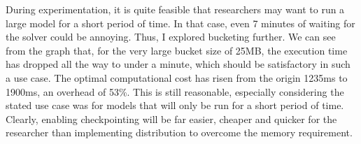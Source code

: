 During experimentation, it is quite feasible that researchers may want to run a large model for a short period of time.
In that case, even 7 minutes of waiting for the solver could be annoying.
Thus, I explored bucketing further.
We can see from the graph that, for the very large bucket size of 25MB, the execution time has dropped all the way to under a minute, which should be satisfactory in such a use case.
The optimal computational cost has risen from the origin 1235ms to 1900ms, an overhead of 53\%.
This is still reasonable, especially considering the stated use case was for models that will only be run for a short period of time.
Clearly, enabling checkpointing will be far easier, cheaper and quicker for the researcher than implementing distribution to overcome the memory requirement.
